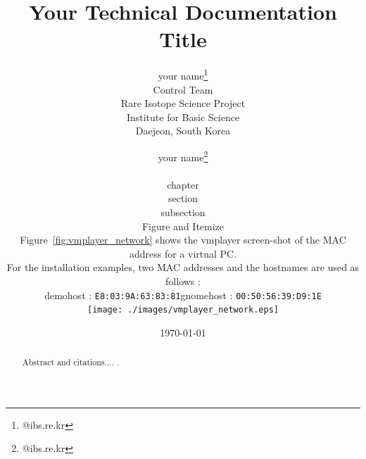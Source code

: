 \documentclass[11pt
  , a4paper
  , article
  , oneside
]{memoir}
\begin{document}
\newcommand{\technumber}{
  RAON Control-Document Series\\
  Revision : v0.1,   Release : a fixed date}
\title{\textbf{Your Technical Documentation \\Title}}

\author{your name\thanks{@ibs.re.kr} \\

\author{your name\thanks{@ibs.re.kr} \\
  Control Team \\
  Rare Isotope Science Project\\
  Institute for Basic Science\\
  Daejeon, South Korea
}

\date{\today}

\renewcommand{\maketitlehooka}{\begin{flushright}\textsf{\technumber}\end{flushright}}

\maketitle

\begin{abstract}
Abstract and citations.... \citep{FAI}. 
\end{abstract}



\chapter{chapter}

\section{section}
\subsection{subsection}

\section{Figure and Itemize}
 Figure~\ref{fig:vmplayer_network} shows the vmplayer screen-shot of the MAC address for a virtual PC.

For the installation examples, two MAC addresses and the hostnames are used as follows :
\begin{itemize}
\item demohost  : \texttt{E8:03:9A:63:83:81}
\item gnomehost : \texttt{00:50:56:39:D9:1E}
\end{itemize}
\begin{figure}[!htb]
  \centering
  \texttt{[image: ./images/vmplayer\_network.eps]}
  \caption{
            MAC address setup for a virtual PC by using vmplayer.
          }
  \label{fig:vmplayer_network}   
\end{figure}



}
\end{document}
